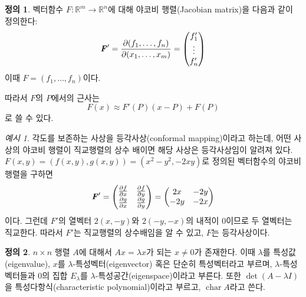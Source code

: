 \documentclass[unfonts,oneside,a4paper]{oblivoir}
\theoremstyle{definition}
\newtheorem{definition}{정의}[section]
\theoremstyle{theorem}
\theoremstyle{theorem}
\theoremstyle{remark}
\theoremstyle{remark}
\theoremstyle{remark}
\newtheorem*{example}{예시}
\theoremstyle{remark}
\renewcommand{\vec}[1]{\bm{\mathit{#1}}}
\newcommand{\vecz}{\bm{\mathrm{0}}}
\DeclareMathOperator{\Char}{char}
\begin{document}
\begin{definition}
    벡터함수 $\vec F: \mathbb R^m \rightarrow \mathbb R^n$에 대해 야코비 행렬(Jacobian matrix)을 다음과 같이 정의한다:
    \begin{equation*}
        \vec F' = \jacob{f_1, \dots, f_n}{x_1, \dots, x_m} =
        \begin{pmatrix}
            f_1' \\ \vdots \\ f_n'
        \end{pmatrix}
    \end{equation*}
    이때 $\vec F = (f_1, \dots, f_n)$이다.
\end{definition}

따라서 $\vec F$의 $P$에서의 근사는
\begin{equation*}
    \vec F(\vec x) \approx \vec F'(P) (\vec x - P) + \vec F(P)
\end{equation*}
로 쓸 수 있다.

\begin{example}
    각도를 보존하는 사상을 등각사상(conformal mapping)이라고 하는데, 어떤 사상의 야코비 행렬이 직교행렬의 상수 배이면 해당 사상은 등각사상임이 알려져 있다.
    $\vec F(x, y) = (f(x, y), g(x, y)) = (x^2 - y^2, -2xy)$로 정의된 벡터함수의 야코비 행렬을 구하면
    \begin{equation*}
        \vec F' =
        \begin{pmatrix}
            \diffp{f}{x} & \diffp{f}{y}\\
            \diffp{g}{x} & \diffp{g}{y}
        \end{pmatrix}
        =
        \begin{pmatrix}
            2x & -2y\\
            -2y & -2x
        \end{pmatrix}
    \end{equation*}
    이다.
    그런데 $\vec F'$의 열벡터 $2(x, -y)$와 $2(-y, -x)$의 내적이 0이므로 두 열벡터는 직교한다.
    따라서 $\vec F'$는 직교행렬의 상수배임을 알 수 있고, $\vec F$는 등각사상이다.
\end{example}

\begin{definition}
    $n \times n$ 행렬 $A$에 대해서 $A \vec x = \lambda \vec x$가 되는 $\vec x \neq \vecz$가 존재한다.
    이때 $\lambda$를 특성값(eigenvalue), $\vec x$를 $\lambda$-특성벡터(eigenvector) 혹은 단순히 특성벡터라고 부르며, $\lambda$-특성벡터들과 $\vecz$의 집합 $E_\lambda$를 $\lambda$-특성공간(eigenspace)이라고 부른다.
    또한 $\det (A - \lambda I)$을 특성다항식(characteristic polynomial)이라고 부르고, $\Char A$라고 쓴다.
\end{definition}
\end{document}
